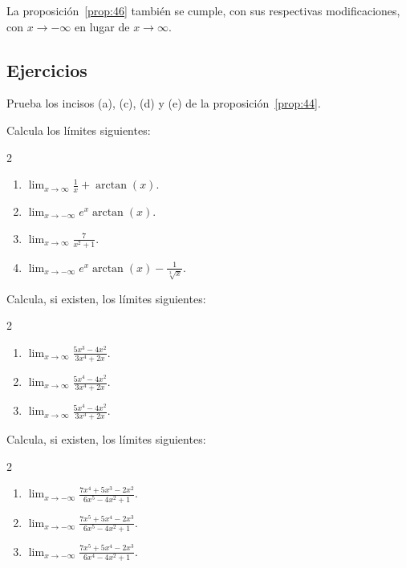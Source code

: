 \documentclass[12pt,a4paper]{book}
\begin{document}
    La proposición~\ref{prop:46} también se cumple, con sus respectivas modificaciones,
    con $x\to-\infty$ en lugar de $x\to\infty$.

    \par{}\subsection*{Ejercicios}

    \begin{ejercicio}\label{ej:161}
        Prueba los incisos (a), (c), (d) y (e) de la proposición~\ref{prop:44}.
    \end{ejercicio}

    \begin{ejercicio}\label{ej:162}
        Calcula los límites siguientes:
        \begin{multicols}{2}
        \begin{enumerate}[nosep]
            \item $\lim_{x\to\infty}\frac{1}{x}+\arctan(x)$.
            \item $\lim_{x\to-\infty}e^{x}\arctan(x)$.
            \item $\lim_{x\to\infty}\frac{7}{x^{2}+1}$.
            \item $\lim_{x\to-\infty}e^{x}\arctan(x)-\frac{1}{\sqrt[3]{x}}$.
        \end{enumerate}
        \end{multicols}
    \end{ejercicio}

    \begin{ejercicio}\label{ej:163}
        Calcula, si existen, los límites siguientes:
        \begin{multicols}{2}
        \begin{enumerate}[nosep]
            \item $\lim_{x\to\infty}\frac{5x^{3}-4x^{2}}{3x^{4}+2x}$.
            \item $\lim_{x\to\infty}\frac{5x^{4}-4x^{2}}{3x^{4}+2x}$.
            \item $\lim_{x\to\infty}\frac{5x^{4}-4x^{2}}{3x^{3}+2x}$.
        \end{enumerate}
        \end{multicols}
    \end{ejercicio}

    \begin{ejercicio}\label{ej:164}
        Calcula, si existen, los límites siguientes:
        \begin{multicols}{2}
        \begin{enumerate}[nosep]
            \item $\lim_{x\to-\infty}\frac{7x^{4}+5x^{3}-2x^{2}}{6x^{5}-4x^{2}+1}$.
            \item $\lim_{x\to-\infty}\frac{7x^{5}+5x^{4}-2x^{3}}{6x^{5}-4x^{2}+1}$.
            \item $\lim_{x\to-\infty}\frac{7x^{5}+5x^{4}-2x^{3}}{6x^{4}-4x^{2}+1}$.
        \end{enumerate}
        \end{multicols}
    \end{ejercicio}
\end{document}

